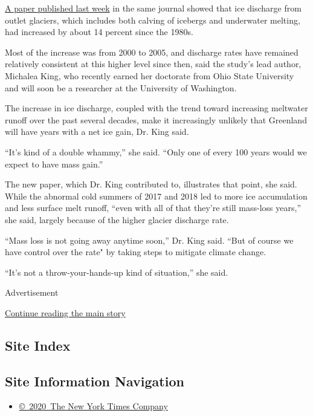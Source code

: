 \href{https://www.nature.com/articles/s43247-020-0001-2\#Sec9}{A paper
published last week} in the same journal showed that ice discharge from
outlet glaciers, which includes both calving of icebergs and underwater
melting, had increased by about 14 percent since the 1980s.

Most of the increase was from 2000 to 2005, and discharge rates have
remained relatively consistent at this higher level since then, said the
study's lead author, Michalea King, who recently earned her doctorate
from Ohio State University and will soon be a researcher at the
University of Washington.

The increase in ice discharge, coupled with the trend toward increasing
meltwater runoff over the past several decades, make it increasingly
unlikely that Greenland will have years with a net ice gain, Dr. King
said.

``It's kind of a double whammy,'' she said. ``Only one of every 100
years would we expect to have mass gain.''

The new paper, which Dr. King contributed to, illustrates that point,
she said. While the abnormal cold summers of 2017 and 2018 led to more
ice accumulation and less surface melt runoff, ``even with all of that
they're still mass-loss years,'' she said, largely because of the higher
glacier discharge rate.

``Mass loss is not going away anytime soon,'' Dr. King said. ``But of
course we have control over the rate" by taking steps to mitigate
climate change.

``It's not a throw-your-hands-up kind of situation,'' she said.

Advertisement

\protect\hyperlink{after-bottom}{Continue reading the main story}

\hypertarget{site-index}{%
\subsection{Site Index}\label{site-index}}

\hypertarget{site-information-navigation}{%
\subsection{Site Information
Navigation}\label{site-information-navigation}}

\begin{itemize}
\tightlist
\item
  \href{https://help.nytimes3xbfgragh.onion/hc/en-us/articles/115014792127-Copyright-notice}{©~2020~The
  New York Times Company}
\end{itemize}

